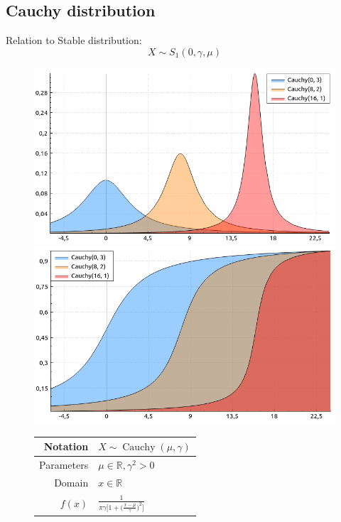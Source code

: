 \documentclass[a4paper,11pt]{article}
\theoremstyle{plain}
\theoremstyle{definition}
\newcommand{\MR}{\mathbb{R}}
\begin{document}
\subsection{Cauchy distribution}
	Relation to Stable distribution:
	\[X \sim S_{1}(0, \gamma, \mu) \]
		\begin{figure}[!htb]\centering
		\begin{minipage}{0.55\textwidth}
			\includegraphics[width=\linewidth, right]{cauchy_pdf}
			\captionsetup{labelformat=empty}
			\includegraphics[width=\linewidth, right]{cauchy_cdf}
			\captionsetup{labelformat=empty}
		\end{minipage}
		\begin{minipage}{0.4\textwidth}
		\begin{tabular}{| r | l |}
			\hline
			Notation & $X \sim \operatorname{Cauchy}(\mu, \gamma)$ \\
			\hline
			Parameters & $\mu \in \MR, \gamma^2 > 0 $ \\
			\hline
			Domain & $x \in \MR$  \\
			\hline
			$f(x)$ & $ \frac{1}{ \pi \gamma \Big[ 1 + \big( \frac{x-\mu}{\gamma} \big)^2 \Big]  }  $ \\

\end{tabular}
\end{minipage}
\end{figure}
\end{document}
